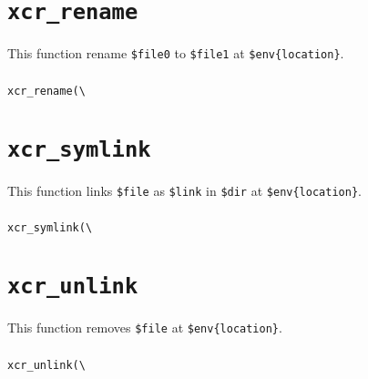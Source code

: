 \documentclass[a4paper,10pt]{report}
\def\|{\verb|} %|
\begin{document}
\section{\texttt{xcr\_rename}}

This function rename \texttt{\$file0} to \texttt{\$file1} at
\texttt{\$env\{location\}}.

\subsubsection{\format}

\begin{boxnote}
\begin{alltt}
xcr_rename(\|\|%\textit{env}, $file0, $file1);
\end{alltt}
\end{boxnote}
\vspace{\baselineskip}

\section{\texttt{xcr\_symlink}}

This function links \texttt{\$file} as \texttt{\$link} in
\texttt{\$dir} at \texttt{\$env\{location\}}.

\subsubsection{\format}

\begin{boxnote}
\begin{alltt}
xcr_symlink(\|\|%\textit{env}, $file, $dir, $link);
\end{alltt}
\end{boxnote}
\vspace{\baselineskip}

\section{\texttt{xcr\_unlink}}

This function removes \texttt{\$file} at \texttt{\$env\{location\}}.

\subsubsection{\format}

\begin{boxnote}
\begin{alltt}
xcr_unlink(\|\|%\textit{env}, $file);
\end{alltt}
\end{boxnote}
\vspace{\baselineskip}
\end{document}
